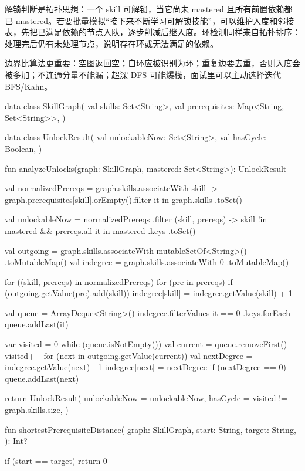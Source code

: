 解锁判断是拓扑思想：一个 skill 可解锁，当它尚未 mastered 且所有前置依赖都已 mastered。若要批量模拟“接下来不断学习可解锁技能”，可以维护入度和邻接表，先把已满足依赖的节点入队，逐步削减后继入度。环检测同样来自拓扑排序：处理完后仍有未处理节点，说明存在环或无法满足的依赖。

边界比算法更重要：空图返回空；自环应被识别为环；重复边要去重，否则入度会被多加；不连通分量不能漏；超深 DFS 可能爆栈，面试里可以主动选择迭代 BFS/Kahn。

\begin{kotlin}
data class SkillGraph(
    val skills: Set<String>,
    val prerequisites: Map<String, Set<String>>,
)

data class UnlockResult(
    val unlockableNow: Set<String>,
    val hasCycle: Boolean,
)

fun analyzeUnlocks(graph: SkillGraph, mastered: Set<String>): UnlockResult {
    val normalizedPrereqs = graph.skills.associateWith { skill ->
        graph.prerequisites[skill].orEmpty().filter { it in graph.skills }.toSet()
    }

    val unlockableNow = normalizedPrereqs
        .filter { (skill, prereqs) -> skill !in mastered && prereqs.all { it in mastered } }
        .keys
        .toSet()

    val outgoing = graph.skills.associateWith { mutableSetOf<String>() }.toMutableMap()
    val indegree = graph.skills.associateWith { 0 }.toMutableMap()

    for ((skill, prereqs) in normalizedPrereqs) {
        for (pre in prereqs) {
            if (outgoing.getValue(pre).add(skill)) {
                indegree[skill] = indegree.getValue(skill) + 1
            }
        }
    }

    val queue = ArrayDeque<String>()
    indegree.filterValues { it == 0 }.keys.forEach { queue.addLast(it) }

    var visited = 0
    while (queue.isNotEmpty()) {
        val current = queue.removeFirst()
        visited++
        for (next in outgoing.getValue(current)) {
            val nextDegree = indegree.getValue(next) - 1
            indegree[next] = nextDegree
            if (nextDegree == 0) queue.addLast(next)
        }
    }

    return UnlockResult(
        unlockableNow = unlockableNow,
        hasCycle = visited != graph.skills.size,
    )
}

fun shortestPrerequisiteDistance(
    graph: SkillGraph,
    start: String,
    target: String,
): Int? {
    if (start == target) return 0

}
\end{kotlin}
